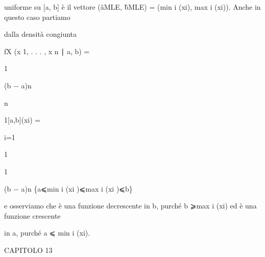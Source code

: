 \documentclass[a4paper,portrait,12pt]{article}
\begin{document}
\begin{flushleft}
uniforme su [a, b] \`{e} il vettore (âMLE, b̂MLE) = (min i (xi), max i (xi)). Anche in questo caso partiamo
\end{flushleft}


\begin{flushleft}
dalla densit\`{a} congiunta
\end{flushleft}


\begin{flushleft}
fX (x 1, . . . , x n ∣ a, b) =
\end{flushleft}





1


\begin{flushleft}
(b $-$ a)n
\end{flushleft}





\begin{flushleft}
n
\end{flushleft}





\begin{flushleft}
1[a,b](xi) =
\end{flushleft}


\begin{flushleft}
i=1
\end{flushleft}





1


1


\begin{flushleft}
(b $-$ a)n \{a⩽min i (xi )⩽max i (xi )⩽b\}
\end{flushleft}





\begin{flushleft}
e osserviamo che \`{e} una funzione decrescente in b, purch\'{e} b ⩾max i (xi) ed \`{e} una funzione crescente
\end{flushleft}


\begin{flushleft}
in a, purch\'{e} a ⩽ min i (xi).
\end{flushleft}





\begin{flushleft}
\newpage
CAPITOLO 13
\end{flushleft}
\end{document}
